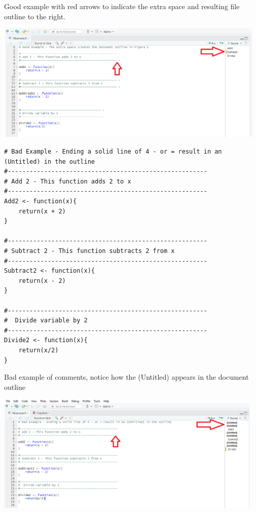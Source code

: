 \documentclass[
]{book}
\begin{document}
Good example with red arrows to indicate the extra space and resulting file outline to the right.

\begin{center}\includegraphics[width=5.09in]{images/FileCommentGoodExample} \end{center}

\begin{verbatim}
# Bad Example - Ending a solid line of 4 - or = result in an (Untitled) in the outline
#-------------------------------------------------------
# Add 2 - This function adds 2 to x
#-------------------------------------------------------
Add2 <- function(x){
    return(x + 2)
}

#-------------------------------------------------------
# Subtract 2 - This function subtracts 2 from x
#-------------------------------------------------------
Subtract2 <- function(x){
    return(x - 2)
}

#-------------------------------------------------------
#  Divide variable by 2
#-------------------------------------------------------
Divide2 <- function(x){
    return(x/2)
}
\end{verbatim}

Bad example of comments, notice how the (Untitled) appears in the document outline

\begin{center}\includegraphics[width=5.04in]{images/FileCommentBadExample} \end{center}
\end{document}
